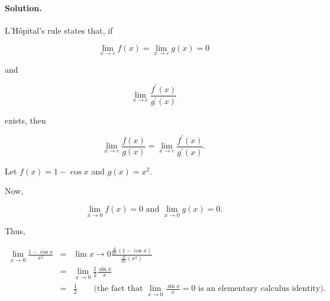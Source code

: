 

\paragraph{Solution.}

L'H\^{o}pital's rule states that, if

\[\lim_{x\to c}f\left(x\right)=\lim_{x\to c}g\left(x\right)=0\]

and

\[\lim_{x\to c}\frac{f^\prime\left(x\right)}{g^\prime\left(x\right)}\]

exists, then

\[\lim_{x\to c}\frac{f\left(x\right)}{g\left(x\right)}=\lim_{x\to c}\frac{f^\prime\left(x\right)}{g^\prime\left(x\right)}.\]

Let $f\left(x\right)=1-\cos x$ and $g\left(x\right)=x^2$.

Now,

\[\lim_{x\to0}f\left(x\right)=0\mbox{ and }\lim_{x\to0}g\left(x\right)=0.\]

Thus,

\begin{eqnarray*}
	\lim_{x\to0}\frac{1-\cos x}{x^2}&=&\lim{x\to0}\frac{\frac{d}{dx}\left(1-\cos x\right)}{\frac{d}{dx}\left(x^2\right)}\\
	&=&\lim_{x\to0}\frac{1}{2}\frac{\sin x}{x}\\
	&=&\frac{1}{2}\qquad\mbox{(the fact that }\lim_{x\to0}\frac{\sin x}{x}=0\mbox{ is an elementary calculus identity).}
\end{eqnarray*}
